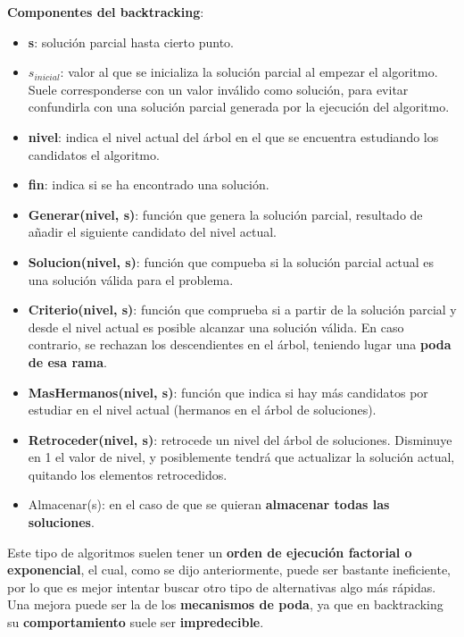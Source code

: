 \documentclass{article}
\begin{document}
\textbf{Componentes del backtracking}:
\begin{itemize}
    \item \textbf{s}: solución parcial hasta cierto punto.
    \item $s_{inicial}$: valor al que se inicializa la solución parcial al empezar el algoritmo. Suele corresponderse con un valor inválido como solución, para evitar confundirla con una solución parcial generada por la ejecución del algoritmo.
    \item \textbf{nivel}: indica el nivel actual del árbol en el que se encuentra estudiando los candidatos el algoritmo.
    \item \textbf{fin}: indica si se ha encontrado una solución.
    \item \textbf{Generar(nivel, s)}: función que genera la solución parcial, resultado de añadir el siguiente candidato del nivel actual.
    \item \textbf{Solucion(nivel, s)}: función que compueba si la solución parcial actual es una solución válida para el problema.
    \item \textbf{Criterio(nivel, s)}: función que comprueba si a partir de la solución parcial y desde el nivel actual es posible alcanzar una solución válida. En caso contrario, se rechazan los
    descendientes en el árbol, teniendo lugar una \textbf{poda de esa rama}.
    \item \textbf{MasHermanos(nivel, s)}: función que indica si hay más candidatos por estudiar en el nivel actual (hermanos en el árbol de soluciones).
    \item \textbf{Retroceder(nivel, s)}: retrocede un nivel del árbol de soluciones. Disminuye en 1 el valor de nivel, y posiblemente tendrá que actualizar la solución actual, quitando los elementos retrocedidos.
    \item Almacenar(s): en el caso de que se quieran \textbf{almacenar todas las soluciones}.
\end{itemize}

Este tipo de algoritmos suelen tener un \textbf{orden de ejecución factorial o exponencial}, el
cual, como se dijo anteriormente, puede ser bastante ineficiente, por lo que es mejor intentar
buscar otro tipo de alternativas algo más rápidas. Una mejora puede ser la de los \textbf{mecanismos
de poda}, ya que en backtracking su \textbf{comportamiento} suele ser \textbf{impredecible}.

\newpage
\end{document}
